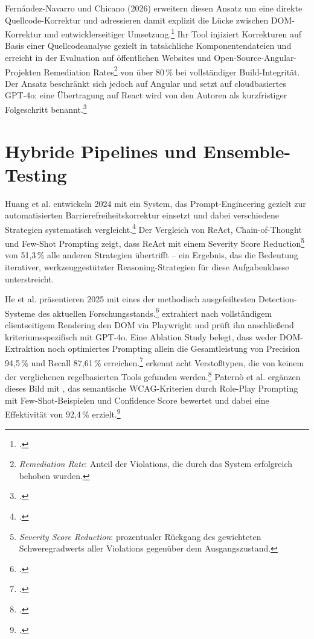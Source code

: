Fernández-Navarro und Chicano (2026) erweitern diesen Ansatz um eine direkte Quellcode-Korrektur und adressieren damit explizit die Lücke zwischen \ac{DOM}-Korrektur und entwicklerseitiger Umsetzung.\footcite[Vgl.][]{fernándeznavarro2026automatedllmbasedaccessibilityremediation} Ihr Tool injiziert Korrekturen auf Basis einer Quellcodeanalyse gezielt in tatsächliche Komponentendateien und erreicht in der Evaluation auf öffentlichen Websites und Open-Source-Angular-Projekten Remediation Rates\footnote{\textit{Remediation Rate}: Anteil der Violations, die durch das System erfolgreich behoben wurden.} von über 80\,\% bei vollständiger Build-Integrität. Der Ansatz beschränkt sich jedoch auf Angular und setzt auf cloudbasiertes GPT-4o; eine Übertragung auf React wird von den Autoren als kurzfristiger Folgeschritt benannt.\footcite[Vgl.][]{fernándeznavarro2026automatedllmbasedaccessibilityremediation}

\section{Hybride Pipelines und Ensemble-Testing}

Huang et al. entwickeln 2024 mit  ein System, das Prompt-Engineering gezielt zur automatisierten Barrierefreiheitskorrektur einsetzt und dabei verschiedene Strategien systematisch vergleicht.\footcite[Vgl.][S. 7,9]{huang_access_2024} Der Vergleich von ReAct, Chain-of-Thought und Few-Shot Prompting zeigt, dass ReAct mit einem Severity Score Reduction\footnote{\textit{Severity Score Reduction}: prozentualer Rückgang des gewichteten Schweregradwerts aller Violations gegenüber dem Ausgangszustand.} von 51{,}3\,\% alle anderen Strategien übertrifft -- ein Ergebnis, das die Bedeutung iterativer, werkzeuggestützter Reasoning-Strategien für diese Aufgabenklasse unterstreicht.

He et al. präsentieren 2025 mit  eines der methodisch ausgefeiltesten Detection-Systeme des aktuellen Forschungsstands.\footcite[Vgl.][FSE101:20--21]{he_enhancing_2025}  extrahiert nach vollständigem clientseitigem Rendering den \ac{DOM} via Playwright und prüft ihn anschließend kriteriumsspezifisch mit GPT-4o. Eine Ablation Study belegt, dass weder \ac{DOM}-Extraktion noch optimiertes Prompting allein die Gesamtleistung von Precision 94{,}5\,\% und Recall 87{,}61\,\% erreichen.\footcite[Vgl.][FSE101:20]{he_enhancing_2025}  erkennt acht Verstoßtypen, die von keinem der verglichenen regelbasierten Tools gefunden werden.\footcite[Vgl.][FSE101:20]{he_enhancing_2025} Paternò et al. ergänzen dieses Bild mit , das semantische \ac{WCAG}-Kriterien durch Role-Play Prompting mit Few-Shot-Beispielen und Confidence Score bewertet und dabei eine Effektivität von 92{,}4\,\% erzielt.\footcite[Vgl.][]{paterno_how_2025}


